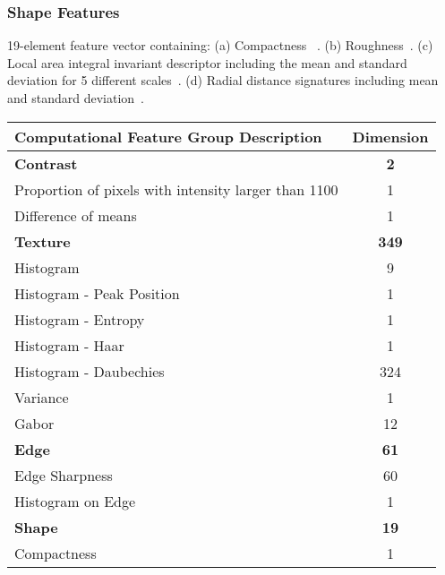 \subsubsection{Shape Features}
19-element feature vector containing: (a) Compactness ~\cite{Duda:1973ul}. (b) Roughness~\cite{Kilday:2002wp}. (c) Local area integral invariant descriptor including the mean and standard deviation for 5 different scales~\cite{Hong:2006ti,Manay:2006un}. (d) Radial distance signatures including mean and standard deviation~\cite{MRangayyan:2005td}.

\begin{table}
	\centering
	\begin{tabular}{|l|c|}
		\hline
		Computational Feature Group Description & Dimension \\ \hline \hline
		\textbf{Contrast} & \textbf{2} \\ \hline
		\hspace{2pt} Proportion of pixels with intensity larger than 1100 & 1 \\ \hline
		\hspace{2pt} Difference of means & 1 \\ \hline
		\textbf{Texture} & \textbf{349} \\ \hline
		\hspace{2pt} Histogram & 9 \\ \hline
		\hspace{2pt} Histogram - Peak Position & 1 \\ \hline
		\hspace{2pt} Histogram - Entropy & 1 \\ \hline
		\hspace{2pt} Histogram - Haar & 1 \\ \hline
		\hspace{2pt} Histogram - Daubechies & 324 \\ \hline
		\hspace{2pt} Variance & 1 \\ \hline
		\hspace{2pt} Gabor & 12 \\ \hline
		\textbf{Edge} & \textbf{61} \\ \hline
		\hspace{2pt} Edge Sharpness & 60 \\ \hline
		\hspace{2pt} Histogram on Edge & 1 \\ \hline
		\textbf{Shape} & \textbf{19} \\ \hline
		\hspace{2pt} Compactness & 1 \\ \hline

\end{tabular}
\end{table}
